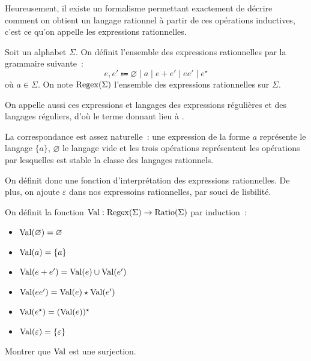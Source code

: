 Heureusement, il existe un formalisme permettant exactement de décrire comment
on obtient un langage rationnel à partir de ces opérations inductives, c'est ce
qu'on appelle les expressions rationnelles.

\begin{definition}
  Soit un alphabet $\Sigma$. On définit l'ensemble des expressions rationnelles
  par la grammaire suivante~:
  \[e,e' \Coloneq \varnothing\mid a \mid e + e' \mid e e' \mid e^\star\]
  où $a \in \Sigma$. On note $\operatorname{Regex}(\Sigma)$ l'ensemble des expressions
  rationnelles sur $\Sigma$.
\end{definition}

\begin{remark}
  On appelle aussi ces expressions et langages des expressions régulières et des
  langages réguliers, d'où le terme  donnant
  lieu à .
\end{remark}

La correspondance est assez naturelle~: une expression de la forme $a$
représente le langage $\{a\}$, $\varnothing$ le langage vide et les trois
opérations représentent les opérations par lesquelles est stable la classe des
langages rationnels.

On définit donc une fonction d'interprétation des expressions rationnelles. De
plus, on ajoute $\varepsilon$ dans nos expressoins rationnelles, par souci de
lisbilité.

\begin{definition}
  On définit la fonction $\operatorname{Val} : \operatorname{Regex}(\Sigma)\to\operatorname{Ratio}(\Sigma)$ par
  induction~:
  \begin{itemize}
  \item $\operatorname{Val}(\varnothing) = \varnothing$
  \item $\operatorname{Val}(a) = \{a\}$
  \item $\operatorname{Val}(e+e') = \operatorname{Val}(e) \cup \operatorname{Val}(e')$
  \item $\operatorname{Val}(ee') = \operatorname{Val}(e) \star \operatorname{Val}(e')$
  \item $\operatorname{Val}(e^\star) = (\operatorname{Val}(e))^\star$
  \item $\operatorname{Val}(\varepsilon) = \{\varepsilon\}$
  \end{itemize}
\end{definition}

\begin{exercise}
  Montrer que $\operatorname{Val}$ est une surjection.
\end{exercise}

